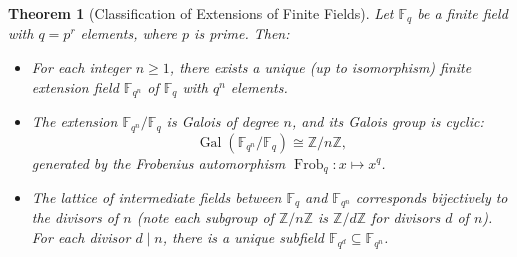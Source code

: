 \documentclass{article}
\newtheorem{theorem}{Theorem}[section]
\theoremstyle{definition}
\theoremstyle{definition}
\theoremstyle{definition}
\newcommand{\Z}{\mathbb{Z}}
\begin{document}
\begin{theorem}[Classification of Extensions of Finite Fields]
Let \( \mathbb{F}_q \) be a finite field with \( q = p^r \) elements, where \( p \) is prime. Then:

\begin{itemize}
    \item For each integer \( n \geq 1 \), there exists a unique (up to isomorphism) finite extension field \( \mathbb{F}_{q^n} \) of \( \mathbb{F}_q \) with \( q^n \) elements.
    
    \item The extension \( \mathbb{F}_{q^n} / \mathbb{F}_q \) is Galois of degree \( n \), and its Galois group is cyclic:
    \[
    \operatorname{Gal}(\mathbb{F}_{q^n} / \mathbb{F}_q) \cong \mathbb{Z}/n\mathbb{Z},
    \]
    generated by the Frobenius automorphism \( \operatorname{Frob}_q : x \mapsto x^q \).
    
    \item The lattice of intermediate fields between \( \mathbb{F}_q \) and \( \mathbb{F}_{q^n} \) corresponds bijectively to the divisors of \( n \) (note each subgroup of $\Z/n\Z$ is $\Z/d\Z$ for divisors $d$ of $n$). For each divisor \( d \mid n \), there is a unique subfield \( \mathbb{F}_{q^d} \subseteq \mathbb{F}_{q^n} \).
\end{itemize}
\end{theorem}



    
\end{document}
